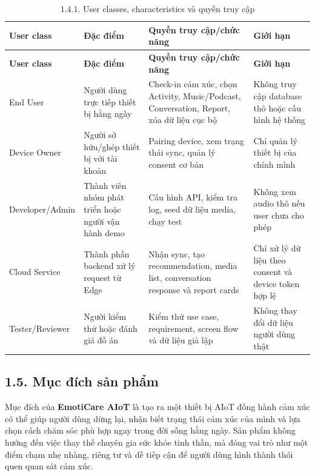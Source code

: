 \documentclass[12pt,a4paper]{article}
\begin{document}
\begin{center}
\scriptsize
\begin{longtable}{|P{0.18\textwidth}|P{0.25\textwidth}|P{0.25\textwidth}|P{0.22\textwidth}|}
\caption{1.4.1. User classes, characteristics và quyền truy cập}\\
\hline
\textbf{User class} & \textbf{Đặc điểm} & \textbf{Quyền truy cập/chức năng} & \textbf{Giới hạn} \\
\hline
\endfirsthead
\hline
\textbf{User class} & \textbf{Đặc điểm} & \textbf{Quyền truy cập/chức năng} & \textbf{Giới hạn} \\
\hline
\endhead
End User & Người dùng trực tiếp thiết bị hằng ngày & Check-in cảm xúc, chọn Activity, Music/Podcast, Conversation, Report, xóa dữ liệu cục bộ & Không truy cập database thô hoặc cấu hình hệ thống \\
\hline
Device Owner & Người sở hữu/ghép thiết bị với tài khoản & Pairing device, xem trạng thái sync, quản lý consent cơ bản & Chỉ quản lý thiết bị của chính mình \\
\hline
Developer/Admin & Thành viên nhóm phát triển hoặc người vận hành demo & Cấu hình API, kiểm tra log, seed dữ liệu media, chạy test & Không xem audio thô nếu user chưa cho phép \\
\hline
Cloud Service & Thành phần backend xử lý request từ Edge & Nhận sync, tạo recommendation, media list, conversation response và report cards & Chỉ xử lý dữ liệu theo consent và device token hợp lệ \\
\hline
Tester/Reviewer & Người kiểm thử hoặc đánh giá đồ án & Kiểm thử use case, requirement, screen flow và dữ liệu giả lập & Không thay đổi dữ liệu người dùng thật \\
\hline
\end{longtable}
\normalsize
\end{center}

\subsection*{1.5. Mục đích sản phẩm}

Mục đích của \textbf{EmotiCare AIoT} là tạo ra một thiết bị AIoT đồng hành cảm xúc có thể giúp người dùng dừng lại, nhận biết trạng thái cảm xúc của mình và lựa chọn cách chăm sóc phù hợp ngay trong đời sống hằng ngày. Sản phẩm không hướng đến việc thay thế chuyên gia sức khỏe tinh thần, mà đóng vai trò như một điểm chạm nhẹ nhàng, riêng tư và dễ tiếp cận để người dùng hình thành thói quen quan sát cảm xúc.
\end{document}

